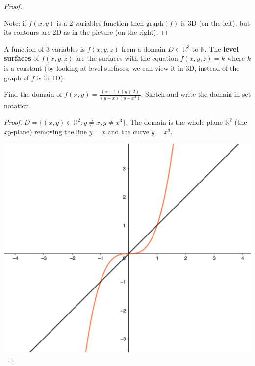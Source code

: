 \begin{proof}
\begin{center}
\end{center}
Note: if $f(x,y)$ is a 2-variables function then $\mathrm{graph}(f)$ is 3D (on the left), but its contours are 2D as in the picture (on the right).
\end{proof}


\begin{definition} A function of 3 variables is $f(x,y,z)$ from a domain $D\subset \mathbb{R}^3$ to $\mathbb{R}$. The \textbf{level surfaces} of $f(x,y,z)$ are the surfaces with the equation $f(x,y,z) = k$ where $k$ is a constant (by looking at level surfaces, we can view it in 3D, instead of the graph of $f$ is in 4D).
\end{definition}

\begin{example} Find the domain of $f(x,y) = \frac{(x-1)(y+2)}{(y-x)(y-x^3)}$. Sketch and write the domain in set notation.
\end{example}
\begin{proof} $D=\{(x,y)\in \mathbb{R}^2: y\neq x, y\neq x^3\}$. The domain is the whole plane $\mathbb{R^2}$ (the $xy$-plane) removing the line $y=x$ and the curve $y=x^3$.

\includegraphics[scale=0.6]{images/11-ex3.png}    

\end{proof}

